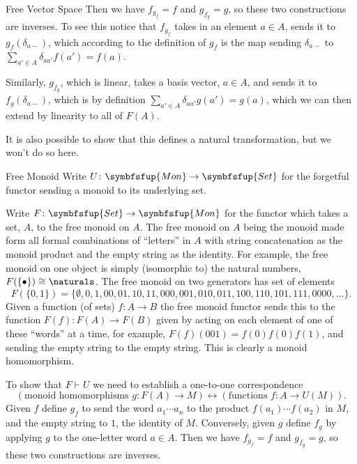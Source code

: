 \documentclass[fleqn]{NotesClass}
\makeatletter
\newcommand{\c@egory}[1]{\symbfsfup{#1}}
\newcommand{\Set}{\c@egory{Set}}
\newcommand{\Mon}{\c@egory{Mon}}
\newcommand{\isomorphic}{\cong}
\newcommand{\leftadjoint}{\vdash}
\makeatother
\begin{document}
\begin{appendices}
\begin{exm}{Free Vector Space}{}
            Then we have \(f_{g_f} = f\) and \(g_{f_g} = g\), so these two constructions are inverses.
            To see this notice that \(f_{g_f}\) takes in an element \(a \in A\), sends it to \(g_f(\delta_{a-})\), which according to the definition of \(g_f\) is the map sending \(\delta_{a-}\) to \(\sum_{a' \in A} \delta_{aa'} f(a') = f(a)\).
            
            Similarly, \(g_{f_g}\), which is linear, takes a basis vector, \(a \in A\), and sends it to \(f_g(\delta_{a-})\), which is by definition \(\sum_{a' \in A} \delta_{aa'}g(a') = g(a)\), which we can then extend by linearity to all of \(F(A)\).
            
            It is also possible to show that this defines a natural transformation, but we won't do so here.
        \end{exm}
        
        \begin{exm}{Free Monoid}{}
            Write \(U \colon \Mon \to \Set\) for the forgetful functor sending a monoid to its underlying set.
            
            Write \(F \colon \Set \to \Mon\) for the functor which takes a set, \(A\), to the free monoid on \(A\).
            The free monoid on \(A\) being the monoid made form all formal combinations of \enquote{letters} in \(A\) with string concatenation as the monoid product and the empty string as the identity.
            For example, the free monoid on one object is simply (isomorphic to) the natural numbers, \(F(\{\bullet\}) \isomorphic \naturals\).
            The free monoid on two generators has set of elements
            \begin{equation}
                F(\{0, 1\}) = \{\emptyset, 0, 1, 00, 01, 10, 11, 000, 001, 010, 011, 100, 110, 101, 111, 0000, \dotsc\}.
            \end{equation}
            Given a function (of sets) \(f \colon A \to B\) the free monoid functor sends this to the function \(F(f)\colon F(A) \to F(B)\) given by acting on each element of one of these \enquote{words} at a time, for example, \(F(f)(001) = f(0)f(0)f(1)\), and sending the empty string to the empty string.
            This is clearly a monoid homomorphism.
            
            To show that \(F \leftadjoint U\) we need to establish a one-to-one correspondence
            \begin{equation}
                (\text{monoid homomorphisms } g\colon F(A) \to M) \leftrightarrow (\text{functions } f \colon A \to U(M)).
            \end{equation}
            Given \(f\) define \(g_f\) to send the word \(a_1 \dotsm a_n\) to the product \(f(a_1)\dotsm f(a_2)\) in \(M\), and the empty string to \(1\), the identity of \(M\).
            Conversely, given \(g\) define \(f_g\) by applying \(g\) to the one-letter word \(a \in A\).
            Then we have \(f_{g_f} = f\) and \(g_{f_g} = g\), so these two constructions are inverses.
            

\end{exm}
\end{appendices}
\end{document}
